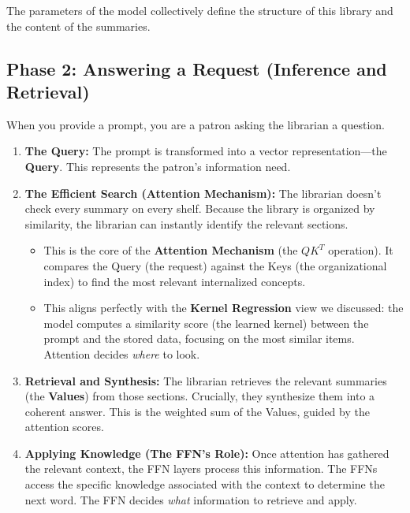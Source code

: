 \documentclass{article}
\begin{document}
The parameters of the model collectively define the structure of this library and the content of the summaries.

\subsection{Phase 2: Answering a Request (Inference and Retrieval)}

When you provide a prompt, you are a patron asking the librarian a question.

\begin{enumerate}
   \item \textbf{The Query:} The prompt is transformed into a vector representation—the \textbf{Query}. This represents the patron's information need.
   \item \textbf{The Efficient Search (Attention Mechanism):} The librarian doesn't check every summary on every shelf. Because the library is organized by similarity, the librarian can instantly identify the relevant sections.
   \begin{itemize}
     \item This is the core of the \textbf{Attention Mechanism} (the $QK^T$ operation). It compares the Query (the request) against the Keys (the organizational index) to find the most relevant internalized concepts.
     \item This aligns perfectly with the \textbf{Kernel Regression} view we discussed: the model computes a similarity score (the learned kernel) between the prompt and the stored data, focusing on the most similar items. Attention decides \emph{where} to look.
   \end{itemize}
   \item \textbf{Retrieval and Synthesis:} The librarian retrieves the relevant summaries (the \textbf{Values}) from those sections. Crucially, they synthesize them into a coherent answer. This is the weighted sum of the Values, guided by the attention scores.
   \item \textbf{Applying Knowledge (The FFN's Role):} Once attention has gathered the relevant context, the FFN layers process this information. The FFNs access the specific knowledge associated with the context to determine the next word. The FFN decides \emph{what} information to retrieve and apply.
\end{enumerate}
\end{document}
